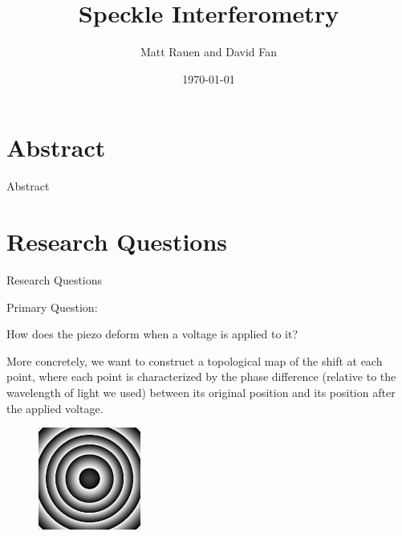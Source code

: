 \documentclass[pdf]{beamer}
\title{Speckle Interferometry}
\author{Matt Rauen and David Fan}
\date{\today}
\begin{document}
\begin{frame}
\titlepage
\end{frame}

\section{Abstract}
\begin{frame}{Abstract}

\end{frame}

\section{Research Questions}
\begin{frame}{Research Questions}
\begin{center}
Primary Question:

How does the piezo deform when a voltage is applied to it?
\end{center}
More concretely, we want to construct a topological map of the shift at each point, where each point is characterized by the phase difference (relative to the wavelength of light we used) between its original position and its position after the applied voltage.
\begin{figure}[htbp]
\centering
\includegraphics[width=0.3\textwidth]{gaussian_bump.png}
\end{figure}
\end{frame}
\end{document}
